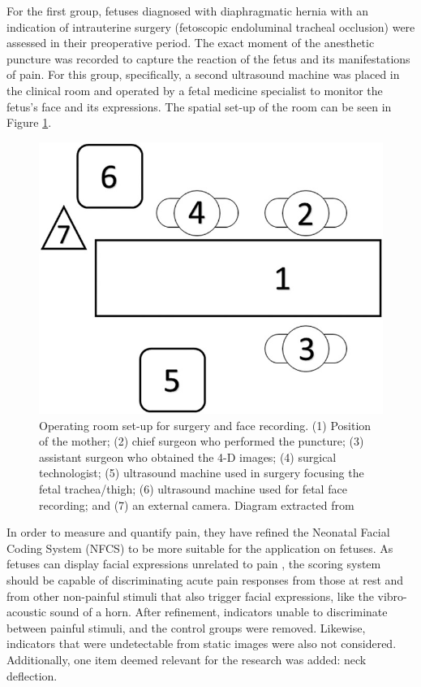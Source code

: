 For the first group, fetuses diagnosed with diaphragmatic hernia with an indication of intrauterine surgery (fetoscopic endoluminal tracheal occlusion) were assessed in their preoperative period. The exact moment of the anesthetic puncture was recorded to capture the reaction of the fetus and its manifestations of pain. For this group, specifically, a second ultrasound machine was placed in the clinical room and operated by a fetal medicine specialist to monitor the fetus’s face and its expressions. The spatial set-up of the room can be seen in Figure \ref{fig:ultrasound}.

\begin{figure}[h!tp]
    \centering
    \includegraphics[width=.45\textwidth]{imgs/chap4_ultrasound_setup.jpg}
    \caption[Operating room set-up for surgery and face recording]{Operating room set-up for surgery and face recording. (1) Position of the mother; (2) chief surgeon who performed the puncture; (3) assistant surgeon who obtained the 4-D images; (4) surgical technologist; (5) ultrasound machine used in surgery focusing the fetal trachea/thigh; (6) ultrasound machine used for fetal face recording; and (7) an external camera. Diagram extracted from \citep{bernardes2018feasibility}}
    \label{fig:ultrasound}
\end{figure}

In order to measure and quantify pain, they have refined the Neonatal Facial Coding System (NFCS) to be more suitable for the application on fetuses. As fetuses can display facial expressions unrelated to pain \citep{Reissland2011}, the scoring system should be capable of discriminating acute pain responses from those at rest and from other non-painful stimuli that also trigger facial expressions, like the vibro-acoustic sound of a horn. After refinement, indicators unable to discriminate between painful stimuli, and the control groups were removed. Likewise, indicators that were undetectable from static images were also not considered. Additionally, one item deemed relevant for the research was added: neck deflection.

